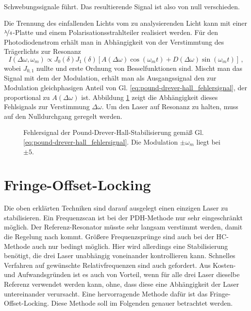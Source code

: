 Schwebungssignale führt. Das resultierende Signal ist also von null
verschieden.\par
Die Trennung des einfallenden Lichts vom zu analysierenden Licht kann mit einer
$\nicefrac{\lambda}{4}$-Platte und einem Polarisationsstrahlteiler realisiert
werden. Für den Photodiodenstrom erhält man in Abhängigkeit von der Verstimmtung
des Trägerlichts zur Resonanz
\begin{equation}\label{eq:pound-drever-hall_fehlersignal}
	I(\Delta\omega,\omega_m)\propto
	J_0(\delta)J_1(\delta)\left[A(\Delta\omega)\cos{(\omega_mt)}+D(\Delta\omega)\sin{(\omega_mt)}\right]\,,
\end{equation}
wobei $J_{0,1}$ nullte und erste Ordnung von Besselfunktionen sind. Mischt man
das Signal mit dem der Modulation, erhält man als Ausgangssignal den zur
Modulation gleichphasigen Anteil von
Gl. \eqref{eq:pound-drever-hall_fehlersignal}, der proportional zu
$A(\Delta\omega)$ ist.
Abbildung \ref{fig:pound-drever-hall_fehlersignal} zeigt die Abhängigkeit dieses
Fehlsignals zur Verstimmung $\Delta\omega$. Um den Laser auf Resonanz zu halten,
muss auf den Nulldurchgang geregelt werden.
\begin{figure}[h]
	\centering
	\footnotesize
	
	\caption[Hänsch-Couillaud - Fehlersignal]{Fehlersignal der
	Pound-Drever-Hall-Stabilisierung
	gemäß Gl.
	\eqref{eq:pound-drever-hall_fehlersignal}. Die Modulation 
	$\pm\omega_m$ liegt bei $\pm5$.}\label{fig:pound-drever-hall_fehlersignal}
\end{figure}

\section{Fringe-Offset-Locking}\label{sec:fringe-offset-locking}
Die oben erklärten Techniken sind darauf ausgelegt einen einzigen Laser zu
stabilisieren. Ein Frequenzscan ist bei der PDH-Methode nur sehr eingeschränkt
möglich. Der Referenz-Resonator müsste sehr langsam verstimmt werden, damit die
Regelung nach kommt. Größere Frequenzsprünge sind auch bei der HC-Methode auch
nur bedingt möglich. Hier wird allerdings eine Stabilisierung benötigt, die drei
Laser unabhängig voneinander kontrollieren kann. Schnelles Verfahren auf
gewünschte Relativfrequenzen sind auch gefordert. Aus Kosten- und
Aufwandsgründen ist es auch von Vorteil, wenn für alle drei Laser dieselbe
Referenz verwendet werden kann, ohne, dass diese eine Abhängigkeit der Laser
untereinander verursacht. Eine hervorragende Methode dafür ist das
Fringe-Offset-Locking. Diese Methode soll im Folgenden genauer betrachtet werden.


